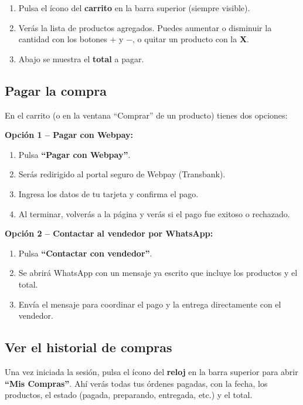 \documentclass[11pt,a4paper]{article}
\begin{document}
\begin{enumerate}[leftmargin=*]
  \item Pulsa el ícono del \textbf{carrito} en la barra superior (siempre visible).
  \item Verás la lista de productos agregados. Puedes aumentar o disminuir la cantidad
        con los botones \textbf{$+$} y \textbf{$-$}, o quitar un producto con la \textbf{X}.
  \item Abajo se muestra el \textbf{total} a pagar.
\end{enumerate}

\subsection{Pagar la compra}

En el carrito (o en la ventana ``Comprar'' de un producto) tienes dos opciones:

\textbf{Opción 1 -- Pagar con Webpay:}
\begin{enumerate}[leftmargin=*]
  \item Pulsa \textbf{``Pagar con Webpay''}.
  \item Serás redirigido al portal seguro de Webpay (Transbank).
  \item Ingresa los datos de tu tarjeta y confirma el pago.
  \item Al terminar, volverás a la página y verás si el pago fue exitoso o rechazado.
\end{enumerate}

\textbf{Opción 2 -- Contactar al vendedor por WhatsApp:}
\begin{enumerate}[leftmargin=*]
  \item Pulsa \textbf{``Contactar con vendedor''}.
  \item Se abrirá WhatsApp con un mensaje ya escrito que incluye los productos y el total.
  \item Envía el mensaje para coordinar el pago y la entrega directamente con el vendedor.
\end{enumerate}

\subsection{Ver el historial de compras}

Una vez iniciada la sesión, pulsa el ícono del \textbf{reloj} en la barra superior para
abrir \textbf{``Mis Compras''}. Ahí verás todas tus órdenes pagadas, con la fecha, los
productos, el estado (pagada, preparando, entregada, etc.) y el total.
\end{document}
